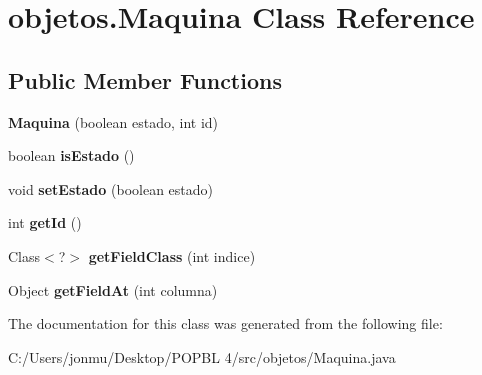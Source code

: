 \hypertarget{classobjetos_1_1_maquina}{}\section{objetos.\+Maquina Class Reference}
\label{classobjetos_1_1_maquina}
\subsection*{Public Member Functions}
\begin{DoxyCompactItemize}
\item 
\mbox{\label{classobjetos_1_1_maquina_abe32f06ca4367bea60d592d504a7a359}} 
{\bfseries Maquina} (boolean estado, int id)
\item 
\mbox{\label{classobjetos_1_1_maquina_a03b4c97926e8db81a5a28459293c16b6}} 
boolean {\bfseries is\+Estado} ()
\item 
\mbox{\label{classobjetos_1_1_maquina_a8a5d703c85d9a8a4a7ff352b01ff085b}} 
void {\bfseries set\+Estado} (boolean estado)
\item 
\mbox{\label{classobjetos_1_1_maquina_aca30cab810f1072e9ab07024d6f97cc6}} 
int {\bfseries get\+Id} ()
\item 
\mbox{\label{classobjetos_1_1_maquina_a8ecfb51ac52f34402a48c572aa710297}} 
Class$<$?$>$ {\bfseries get\+Field\+Class} (int indice)
\item 
\mbox{\label{classobjetos_1_1_maquina_ab50c4dec88d2de79313a9a369df0ffd3}} 
Object {\bfseries get\+Field\+At} (int columna)
\end{DoxyCompactItemize}


The documentation for this class was generated from the following file\+:\begin{DoxyCompactItemize}
\item 
C\+:/\+Users/jonmu/\+Desktop/\+P\+O\+P\+B\+L 4/src/objetos/Maquina.\+java\end{DoxyCompactItemize}
